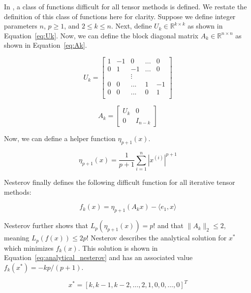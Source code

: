 \documentclass[journal]{IEEEtran}
\begin{document}
In \cite{Nesterov2019}, a class of functions difficult for all tensor methods is defined. We restate the definition of this class of functions here for clarity. Suppose we define integer parameters $n$, $p \ge 1$, and $2 \le k \le n$. Next, define $U_k \in \mathbb{R}^{k \times k}$ as shown in Equation~\ref{eq:Uk}. Now, we can define the block diagonal matrix $A_k \in \mathbb{R}^{n \times n}$ as shown in Equation~\ref{eq:Ak}.

\begin{equation}
    U_k = \begin{bmatrix}
        1 & -1 & 0 & ... & 0 \\
        0 & 1 & -1 & ... & 0 \\
        & & \vdots & & \\
        0 & 0 & ... & 1 & -1 \\
        0 & 0 & ... & 0 & 1 \\
    \end{bmatrix}
    \label{eq:Uk}
\end{equation}

\begin{equation}
    A_k = \begin{bmatrix}
        U_k & 0 \\
        0 & I_{n-k}
    \end{bmatrix}
    \label{eq:Ak}
\end{equation}

Now, we can define a helper function $\eta_{p+1}(x)$.

\begin{equation}
    \eta_{p+1}(x) = \frac{1}{p+1} \sum_{i=1}^n |x^{(i)}|^{p+1}
\end{equation}

Nesterov finally defines the following difficult function for all iterative tensor methods:

\begin{equation}
    f_k(x) = \eta_{p+1}(A_k x) - \langle e_1, x \rangle
\end{equation}

Nesterov further shows that $L_p(\eta_{p+1}(x)) = p!$ and that $\|A_k\|_2 \le 2$, meaning $L_p(f(x)) \le 2p!$ Nesterov describes the analytical solution for $x^*$ which minimizes $f_k(x)$. This solution is shown in Equation~\ref{eq:analytical_nesterov} and has an associated value $f_k(x^*)=-kp/(p+1)$.

\begin{equation}
    x^*= [k, k-1, k-2, \dots, 2, 1, 0, 0, \dots, 0]^T
    \label{eq:analytical_nesterov}
\end{equation}
\end{document}
